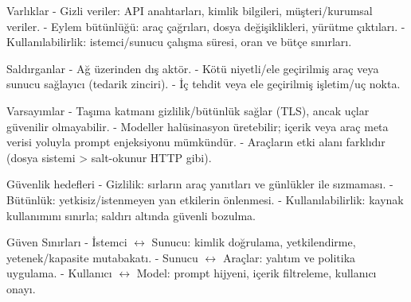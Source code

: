 Varlıklar
- Gizli veriler: API anahtarları, kimlik bilgileri, müşteri/kurumsal veriler.
- Eylem bütünlüğü: araç çağrıları, dosya değişiklikleri, yürütme çıktıları.
- Kullanılabilirlik: istemci/sunucu çalışma süresi, oran ve bütçe sınırları.

Saldırganlar
- Ağ üzerinden dış aktör.
- Kötü niyetli/ele geçirilmiş araç veya sunucu sağlayıcı (tedarik zinciri).
- İç tehdit veya ele geçirilmiş işletim/uç nokta.

Varsayımlar
- Taşıma katmanı gizlilik/bütünlük sağlar (TLS), ancak uçlar güvenilir olmayabilir.
- Modeller halüsinasyon üretebilir; içerik veya araç meta verisi yoluyla prompt enjeksiyonu mümkündür.
- Araçların etki alanı farklıdır (dosya sistemi > salt-okunur HTTP gibi).

Güvenlik hedefleri
- Gizlilik: sırların araç yanıtları ve günlükler ile sızmaması.
- Bütünlük: yetkisiz/istenmeyen yan etkilerin önlenmesi.
- Kullanılabilirlik: kaynak kullanımını sınırla; saldırı altında güvenli bozulma.

Güven Sınırları
- İstemci $\leftrightarrow$ Sunucu: kimlik doğrulama, yetkilendirme, yetenek/kapasite mutabakatı.
- Sunucu $\leftrightarrow$ Araçlar: yalıtım ve politika uygulama.
- Kullanıcı $\leftrightarrow$ Model: prompt hijyeni, içerik filtreleme, kullanıcı onayı.

